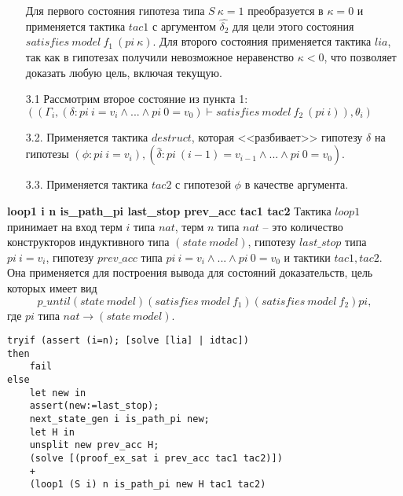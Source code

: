 \documentclass[12pt]{article}
\begin{document}
\begin{enumerate}
Для первого состояния гипотеза типа $S\ \kappa = 1$ преобразуется в $\kappa = 0$ и применяется тактика $tac1$ с аргументом $\hat{\delta_2}$ для цели этого состояния $satisfies\ model\ f_1\ (pi\ \kappa)$.
Для второго состояния применяется тактика $lia$, так как в гипотезах получили невозможное неравенство $\kappa<0$, что позволяет доказать любую цель, включая текущую.
\item[3.1] Рассмотрим второе состояние из пункта 1:
$((\Gamma_i, (\delta : pi\ i = v_i \wedge ... \wedge pi\ 0 = v_0) \vdash satisfies\ model\ f_2\ (pi\ i)), \theta_i)$
\item[3.2.] Применяется тактика $destruct$, которая <<разбивает>> гипотезу $\delta$ на гипотезы $(\phi:pi\ i = v_i),(\hat{\delta} : pi\ (i-1) = v_{i-1} \wedge ... \wedge pi\ 0 = v_0)$.
\item[3.3.] Применяется тактика $tac2$ с гипотезой $\phi$ в качестве аргумента.
\end{enumerate}


\textbf{loop1 i n is\_path\_pi last\_stop prev\_acc tac1 tac2}
Тактика $loop1$ принимает на вход терм $i$ типа $nat$, терм $n$ типа $nat$ -- это количество конструкторов индуктивного типа $(state\ model)$, гипотезу $last\_stop$ типа $pi\ i = v_i$, гипотезу $prev\_acc$ типа $pi\ i = v_{i} \wedge ... \wedge pi\ 0 = v_0$ и тактики $tac1,tac2$. Она применяется для построения вывода для состояний доказательств, цель которых имеет вид
$$p\_until (state\ model) (satisfies\ model\ f_1) (satisfies\ model\ f_2) pi,$$ где $pi$ типа $nat \xrightarrow{} (state\ model)$.

\begin{verbatim}
tryif (assert (i=n); [solve [lia] | idtac])
then 
    fail
else
    let new in
    assert(new:=last_stop);
    next_state_gen i is_path_pi new;
    let H in
    unsplit new prev_acc H;
    (solve [(proof_ex_sat i prev_acc tac1 tac2)]) 
    + 
    (loop1 (S i) n is_path_pi new H tac1 tac2)
\end{verbatim}
\end{document}
